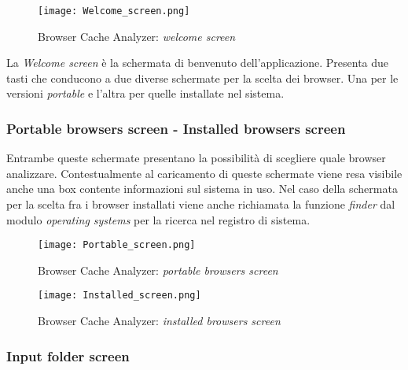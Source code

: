 \begin{figure}[htpb]
	\begin{center}
		\texttt{[image: Welcome\_screen.png]}
	\end{center}
	\caption[Browser Cache Analyzer: \textit{welcome screen}]{Browser Cache Analyzer: \textit{welcome screen}}
\end{figure}

La \textit{Welcome screen} è la schermata di benvenuto dell'applicazione. Presenta due tasti che conducono a due diverse schermate per la scelta dei browser. Una per le versioni \textit{portable} e l'altra per quelle installate nel sistema.

\clearpage

\subsubsection{Portable browsers screen - Installed browsers screen}

Entrambe queste schermate presentano la possibilità di scegliere quale browser analizzare. Contestualmente al caricamento di queste schermate viene resa visibile anche una box contente informazioni sul sistema in uso. Nel caso della schermata per la scelta fra i browser installati viene anche richiamata la funzione \textit{finder} dal modulo \textit{operating systems} per la ricerca nel registro di sistema.

\begin{figure}[htpb]
	\begin{center}
		\texttt{[image: Portable\_screen.png]}
	\end{center}
	\caption[Browser Cache Analyzer: \textit{portable browsers screen}]{Browser Cache Analyzer: \textit{portable browsers screen}}
\end{figure}

\begin{figure}[htpb]
	\begin{center}
		\texttt{[image: Installed\_screen.png]}
	\end{center}
	\caption[Browser Cache Analyzer: \textit{installed browsers screen}]{Browser Cache Analyzer: \textit{installed browsers screen}}
\end{figure}

\clearpage


\subsubsection{Input folder screen}

